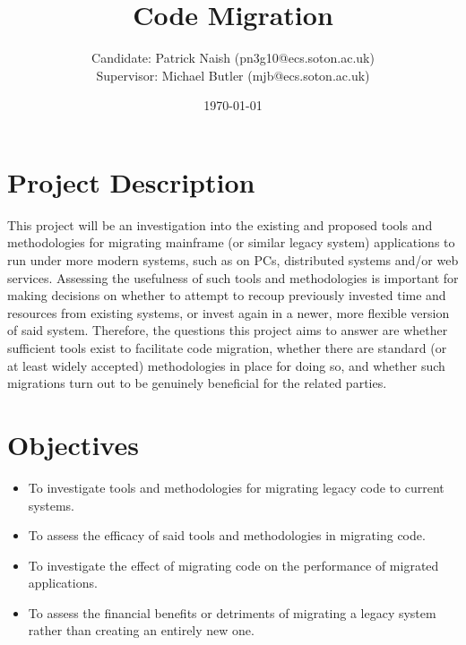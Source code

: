 \documentclass[a4paper,10pt]{article}
\title{Code Migration}
\date{\today}
\author{Candidate: Patrick Naish (pn3g10@ecs.soton.ac.uk)\\Supervisor: Michael Butler (mjb@ecs.soton.ac.uk)}
\begin{document}
\maketitle

\section{Project Description}
This project will be an investigation into the existing and proposed tools and methodologies for migrating mainframe (or similar legacy system) applications to run under more modern systems, such as on PCs, distributed systems and/or web services. Assessing the usefulness of such tools and methodologies is important for making decisions on whether to attempt to recoup previously invested time and resources from existing systems, or invest again in a newer, more flexible version of said system. Therefore, the questions this project aims to answer are whether sufficient tools exist to facilitate code migration, whether there are standard (or at least widely accepted) methodologies in place for doing so, and whether such migrations turn out to be genuinely beneficial for the related parties.

\section{Objectives}
\begin{itemize}
	\item To investigate tools and methodologies for migrating legacy code to current systems.
	\item To assess the efficacy of said tools and methodologies in migrating code.
	\item To investigate the effect of migrating code on the performance of migrated applications.
	\item To assess the financial benefits or detriments of migrating a legacy system rather than creating an entirely new one.
\end{itemize}
\end{document}
